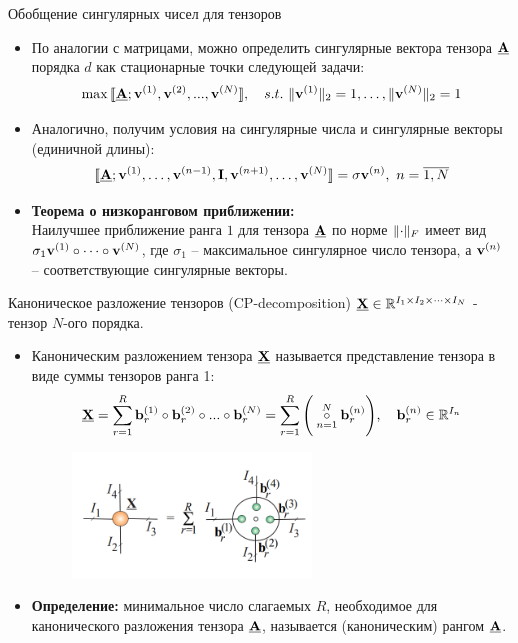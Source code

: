 \begin{frame}{Обобщение сингулярных чисел для тензоров}

\begin{itemize}
    \item  По аналогии с матрицами, можно определить сингулярные вектора тензора $\underline{\textbf{A}}$ порядка $d$ как стационарные точки следующей задачи:
    $$ \max{\llbracket \tensor{A}; \M{v}^{(1)}, \M{v}^{(2)},...,\M{v}^{(N)}\rrbracket}, \quad s.t. \ \norm{\M{v}^{(1)}}_2 = 1, \dots, \norm{\M{v}^{(N)}}_2 = 1 $$
    \item Аналогично, получим условия на сингулярные числа и сингулярные векторы (единичной длины):
    $$ \llbracket \underline{\textbf{A}}; \textbf{v}^{(1)}, \dots, \textbf{v}^{(n-1)}, \textbf{I}, \textbf{v}^{(n+1)}, \dots, \textbf{v}^{(N)}\rrbracket = \sigma \textbf{v}^{(n)}, \ n = \overline{1,N}$$
    \item \textbf{Теорема о низкоранговом приближении:} \\
    Наилучшее приближение ранга $1$ для тензора $\underline{\textbf{A}}$ по норме $\lVert \cdot \rVert_F$ имеет вид $\sigma_1 \textbf{v}^{(1)} \circ \dots \circ \textbf{v}^{(N)}$, где $\sigma_1$ -- максимальное сингулярное число тензора, а $\textbf{v}^{(n)}$ -- соответствующие сингулярные векторы. 
    
\end{itemize}

\end{frame}
\begin{frame}{Каноническое разложение тензоров (CP-decomposition)}
\vspace{0.1cm}
$\underline{\textbf{X}} \in \mathbb{R}^{I_1 \times I_2 \times \dots \times I_N}$ - тензор $N$-ого порядка.
\begin{itemize}
    \item Каноническим разложением тензора $\underline{\textbf{X}}$ называется представление тензора в виде суммы тензоров ранга 1:
    $$ \underline{\textbf{X}} = \sum_{r=1}^R \textbf{b}_r^{(1)} \circ \textbf{b}_r^{(2)} \circ ... \circ \textbf{b}_r^{(N)} = \sum_{r=1}^R \Bigg( \overset{N}{\underset{n = 1}{\circ}} \textbf{b}_r^{(n)} \Bigg), \quad \textbf{b}_r^{(n)} \in \mathbb{R}^{I_n}$$


\begin{figure}
    \centering
    \includegraphics[width=0.6\textwidth]{lecture_11/figs/cp_decomp.png}
\end{figure}

\item \textbf{Определение:} минимальное число слагаемых $R$, необходимое для канонического разложения тензора $\underline{\textbf{A}}$, называется (каноническим) рангом $\underline{\textbf{A}}$.
\end{itemize}




\end{frame}
